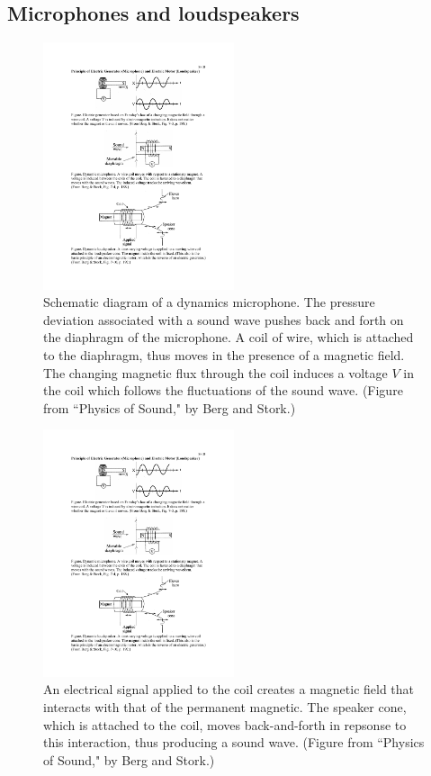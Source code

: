 \subsection{Microphones and loudspeakers}
%
\begin{figure}[htbp]
\begin{center}
\includegraphics[width=0.5\textwidth]{microphone}
\caption{Schematic diagram of a dynamics microphone.
The pressure deviation associated with a sound wave
pushes back and forth on the diaphragm of the microphone.
A coil of wire, which is attached to the diaphragm, thus
moves in the presence of a magnetic field.
The changing magnetic flux through the coil induces a voltage $V$ in
the coil which follows the fluctuations of the sound wave.
(Figure from ``Physics of Sound," by Berg and Stork.)} 
\label{f:microphone}
\end{center}
\end{figure}
%
%
\begin{figure}[htbp]
\begin{center}
\includegraphics[width=0.5\textwidth]{loudspeaker}
\caption{An electrical signal applied to the coil 
creates a magnetic field that interacts with that of the
permanent magnetic.
The speaker cone, which is attached to the coil, 
moves back-and-forth in repsonse to this interaction,
thus producing a sound wave. 
(Figure from ``Physics of Sound," by Berg and Stork.)} 
\label{f:loudspeaker}
\end{center}
\end{figure}
